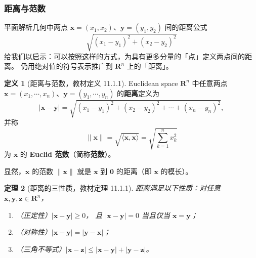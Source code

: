 \documentclass[11pt]{ctexart}
\theoremstyle{plain}
\newtheorem{thm}{定理}[section]
\theoremstyle{definition}
\newtheorem{defn}[thm]{定义}
\theoremstyle{remark}
\begin{document}
\subsubsection{距离与范数}

平面解析几何中两点 \(\boldsymbol{x}=(x_1,x_2)\)、\(\boldsymbol{y}=(y_1,y_2)\) 间的距离公式
\[
  \sqrt{(x_1-y_1)^2+(x_2-y_2)^2}
\]
给我们以启示：可以按照这样的方式，为具有更多分量的「点」定义两点间的距离。
仍用绝对值的符号表示推广到 \(\mathbf{R}^n\) 上的「距离」。

\begin{defn}[距离与范数，教材定义 11.1.1]\label{def:dist}
Euclidean space \(\mathbf{R}^n\) 中任意两点
\(\boldsymbol{x}=(x_1,\cdots,x_n)\)、\(\boldsymbol{y}=(y_1,\cdots,y_n)\) 的\textbf{距离}定义为
\[
  |\boldsymbol{x}-\boldsymbol{y}|
  =\sqrt{(x_1-y_1)^2+(x_2-y_2)^2+\cdots+(x_n-y_n)^2},
\]
并称
\[
  \|\boldsymbol{x}\|=\sqrt{\langle \boldsymbol{x},\boldsymbol{x}\rangle}
  =\sqrt{\sum_{k=1}^{n}x_k^2}
\]
为 \(\boldsymbol{x}\) 的 \textbf{Euclid 范数}（简称\textbf{范数}）。
\end{defn}

显然，\(\boldsymbol{x}\) 的范数 \(\|\boldsymbol{x}\|\) 就是 \(\boldsymbol{x}\) 到
\(\boldsymbol{0}\) 的距离（即 \(\boldsymbol{x}\) 的模长）。

\begin{thm}[距离的三性质，教材定理 11.1.1]\label{thm:metric}
距离满足以下性质：对任意 \(\boldsymbol{x},\boldsymbol{y},\boldsymbol{z}\in\mathbf{R}^n\)，
\begin{enumerate}
  \item （正定性）\(|\boldsymbol{x}-\boldsymbol{y}|\ge 0\)，
        且 \(|\boldsymbol{x}-\boldsymbol{y}|=0\) 当且仅当 \(\boldsymbol{x}=\boldsymbol{y}\)；
  \item （对称性）\(|\boldsymbol{x}-\boldsymbol{y}|=|\boldsymbol{y}-\boldsymbol{x}|\)；
  \item （三角不等式）\(|\boldsymbol{x}-\boldsymbol{z}|
        \le|\boldsymbol{x}-\boldsymbol{y}|+|\boldsymbol{y}-\boldsymbol{z}|\)。
\end{enumerate}
\end{thm}
\end{document}
